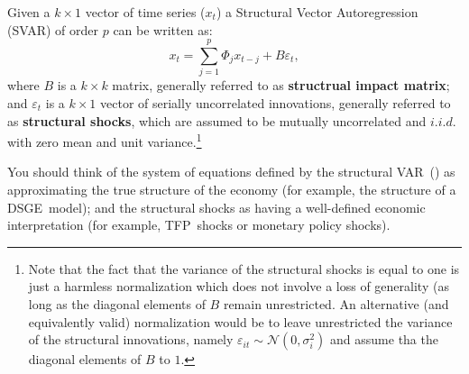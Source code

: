 \documentclass[10pt]{article}
\begin{document}
Given a $k\times 1$ vector of time series ($x_{t}$) a Structural Vector
Autoregression (SVAR) of order $p$ can be written as:%
\begin{equation}
x_{t}=\sum_{j=1}^{p}\Phi _{j}x_{t-j}+B\varepsilon _{t},
\label{eq:struct_var_0}
\end{equation}%
where $B$ is a $k\times k$ matrix, generally referred to as \textbf{%
structrual impact matrix}; and $\varepsilon _{t}$ is a $k\times 1$ vector of
serially uncorrelated innovations, generally referred to as \textbf{%
structural shocks}, which are assumed to be mutually uncorrelated and $i.i.d.
$ with zero mean and unit variance.\footnote{%
Note that the fact that the variance of the structural shocks is equal to
one is just a harmless normalization which does not involve a loss of
generality (as long as the diagonal elements of $B$ remain unrestricted. An
alternative (and equivalently valid) normalization would be to leave
unrestricted the variance of the structural innovations, namely $\varepsilon
_{it}\sim \mathcal{N}(0,\sigma _{i}^{2})$ and assume tha the diagonal
elements of $B$ to $1$.}

You should think of the system of equations defined by the structural VAR\
() as approximating the true structure of the economy (for example, the
structure of a DSGE\ model); and the structural shocks as having a
well-defined economic interpretation (for example, TFP\ shocks or monetary
policy shocks).
\end{document}
